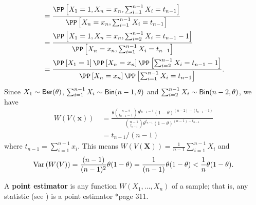 \begin{exam}
\begin{align*}
         & = \frac{\PP \left[ X_1 = 1 , X_n = x_n , \sum_{i=1}^{n-1} X_i = t_{n-1} \right]}{\PP \left[ X_n = x_n , \sum_{i=1}^{n-1} X_i = t_{n-1} \right]}                                                           \\
         & = \frac{\PP \left[ X_1 = 1 , X_n = x_n , \sum_{i=2}^{n-1} X_i = t_{n-1} - 1 \right]}{\PP \left[ X_n = x_n , \sum_{i=1}^{n-1} X_i = t_{n-1} \right]}                                                       \\
         & = \frac{\PP \left[ X_1 = 1 \right] \PP \left[  X_n = x_n \right]  \PP \left[ \sum_{i=2}^{n-1} X_i = t_{n-1} - 1 \right]}{\PP \left[ X_n = x_n \right] \PP \left[ \sum_{i=1}^{n-1} X_i = t_{n-1} \right]}.
    \end{align*}
    Since $X_1 \sim {\sf Ber} (\theta)$, $\sum_{i=1}^{n-1} X_i \sim {\sf Bin} (n-1,\theta)$ and $\sum_{i=2}^{n-1} X_i \sim {\sf Bin} (n-2,\theta)$, we have
    \begin{align*}
        W(V(\bm{x})) \
         & = \frac{\theta \binom{n-2}{t_{n-1}-1} \theta^{t_{n-1}-1} {(1-\theta)}^{(n-2)-(t_{n-1}-1)}}{\binom{n-1}{t_{n-1}} \theta^{t_{n-1}} (1-\theta)^{(n-1)-t_{n-1}}} \\
         & = t_{n-1}/(n-1)
    \end{align*}
    where $t_{n-1} = \sum_{i=1}^{n-1} x_i$. This means $W(V(\bm{X})) = \frac{1}{n-1} \sum_{i=1}^{n-1} X_i$ and
    \begin{equation*}
        {\operatorname{Var}} \left( W(V) \right) = \frac{(n-1)}{(n-1)^2} \theta (1-\theta) = \frac{1}{(n-1)} \theta (1 - \theta) < \frac{1}{n} \theta (1 - \theta).
    \end{equation*}
\end{exam}

\begin{defe}[Point Estimator] \label{defe: point_estimator}
    A {\bf point estimator} is any function $W(X_1 , \ldots , X_n)$ of a sample; that is, any statistic (see ) is a point estimator \cite{CasellaGeorge2001SI}*{page 311}.
\end{defe}

